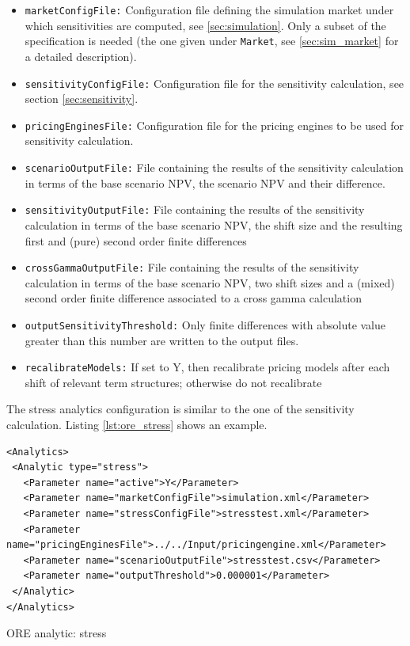 \documentclass[12pt, a4paper]{article}
\begin{document}
{\begin{itemize}
\item {\tt marketConfigFile:} Configuration file defining the simulation market under which sensitivities are computed,
  see \ref{sec:simulation}. Only a subset of the specification is needed (the one given under {\tt Market}, see
  \ref{sec:sim_market} for a detailed description).
\item {\tt sensitivityConfigFile:} Configuration file  for the sensitivity calculation, see section \ref{sec:sensitivity}.
\item {\tt pricingEnginesFile:} Configuration file for the pricing engines to be used for sensitivity calculation.
\item {\tt scenarioOutputFile:} File containing the results of the sensitivity calculation in terms of the base scenario
  NPV, the scenario NPV and their difference.
\item {\tt sensitivityOutputFile:} File containing the results of the sensitivity calculation in terms of the base scenario
  NPV, the shift size and the resulting first and (pure) second order finite differences
\item {\tt crossGammaOutputFile:} File containing the results of the sensitivity calculation in terms of the base scenario
  NPV, two shift sizes and a (mixed) second order finite difference associated to a cross gamma calculation
\item {\tt outputSensitivityThreshold:} Only finite differences with absolute value greater than this number are written
  to the output files.
\item {\tt recalibrateModels:} If set to Y, then recalibrate pricing models after each shift of relevant term structures; otherwise do not recalibrate
\end{itemize}

The stress analytics configuration is similar to the one of the sensitivity calculation. Listing \ref{lst:ore_stress}
shows an example.

\begin{listing}[H]
\begin{verbatim}
<Analytics>
 <Analytic type="stress">
   <Parameter name="active">Y</Parameter>
   <Parameter name="marketConfigFile">simulation.xml</Parameter>
   <Parameter name="stressConfigFile">stresstest.xml</Parameter>
   <Parameter name="pricingEnginesFile">../../Input/pricingengine.xml</Parameter>
   <Parameter name="scenarioOutputFile">stresstest.csv</Parameter>
   <Parameter name="outputThreshold">0.000001</Parameter>
 </Analytic>
</Analytics>
\end{verbatim}
\caption{ORE analytic: stress}
\label{lst:ore_stress}
\end{listing}

}
\end{document}
